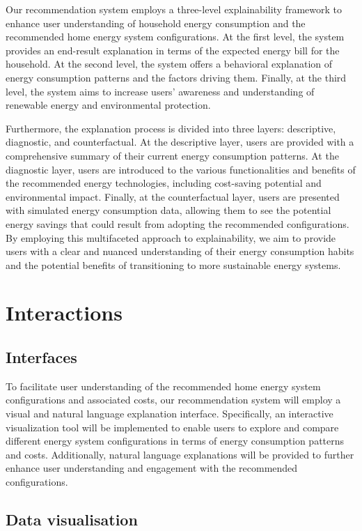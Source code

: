 Our recommendation system employs a three-level explainability framework to enhance user understanding of household energy consumption and the recommended home energy system configurations. 
At the first level, the system provides an end-result explanation in terms of the expected energy bill for the household. 
At the second level, the system offers a behavioral explanation of energy consumption patterns and the factors driving them. 
Finally, at the third level, the system aims to increase users' awareness and understanding of renewable energy and environmental protection.

Furthermore, the explanation process is divided into three layers: descriptive, diagnostic, and counterfactual. 
At the descriptive layer, users are provided with a comprehensive summary of their current energy consumption patterns. 
At the diagnostic layer, users are introduced to the various functionalities and benefits of the recommended energy technologies, including cost-saving potential and environmental impact. 
Finally, at the counterfactual layer, users are presented with simulated energy consumption data, allowing them to see the potential energy savings that could result from adopting the recommended configurations. 
By employing this multifaceted approach to explainability, we aim to provide users with a clear and nuanced understanding of their energy consumption habits and the potential benefits of transitioning to more sustainable energy systems. 


\section{Interactions}

\subsection{Interfaces}

To facilitate user understanding of the recommended home energy system configurations and associated costs, our recommendation system will employ a visual and natural language explanation interface. 
Specifically, an interactive visualization tool will be implemented to enable users to explore and compare different energy system configurations in terms of energy consumption patterns and costs. 
Additionally, natural language explanations will be provided to further enhance user understanding and engagement with the recommended configurations. 


\subsection{Data visualisation}


